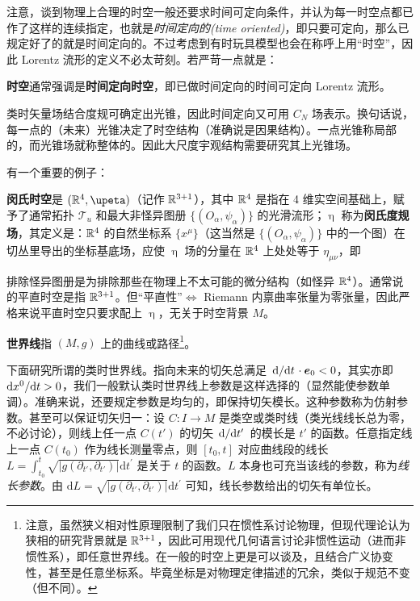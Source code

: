 注意，谈到物理上合理的时空一般还要求时间可定向条件，并认为每一时空点都已作了这样的连续指定，也就是\textit{时间定向的(time oriented)}，即只要可定向，那么已规定好了的就是时间定向的。不过考虑到有时玩具模型也会在称呼上用“时空”，因此 Lorentz 流形的定义不必太苛刻。若严苛一点就是：
    \begin{definition}
        \textbf{时空}通常强调是\textbf{时间定向时空}，即已做时间定向的时间可定向 Lorentz 流形。
    \end{definition}
    类时矢量场结合度规可确定出光锥，因此时间定向又可用 $C_N$ 场表示。换句话说，每一点的（未来）光锥决定了时空结构（准确说是因果结构）。一点光锥称局部的，而光锥场就称整体的。因此大尺度宇观结构需要研究其上光锥场。

    有一个重要的例子：
    \begin{eg}
        \textbf{闵氏时空}是 $(\R^4,\upeta)$（记作 $\mathbb{R}^{3+1}$），其中 $\mathbb{R}^4$ 是指在 4 维实空间基础上，赋予了通常拓扑 $\mathcal T_u$ 和最大非怪异图册 $\{(O_\alpha,\psi_\alpha)\}$ 的光滑流形；$\upeta$ 称为\textbf{闵氏度规场}，其定义是：$\mathbb{R}^4$ 的自然坐标系 $\{x^\mu\}$（这当然是 $\{(O_\alpha,\psi_\alpha)\}$ 中的一个图）在切丛里导出的坐标基底场，应使 $\upeta$ 场的分量在 $\mathbb{R}^4$ 上处处等于 $\eta_{\mu\nu}$，即
    \end{eg}



    排除怪异图册是为排除那些在物理上不太可能的微分结构（如怪异 $\mathbb{R}^4$）。通常说的平直时空是指 $\mathbb{R}^{3+1}$。但“平直性”$\iff$ Riemann 内禀曲率张量为零张量，因此严格来说平直时空只要求配上 $\upeta$，无关于时空背景 $M$。

\begin{definition}
    \textbf{世界线}指 $(M,g)$ 上的曲线或路径\footnote{注意，虽然狭义相对性原理限制了我们只在惯性系讨论物理，但现代理论认为狭相的研究背景就是 $\mathbb{R}^{3+1}$，因此可用现代几何语言讨论非惯性运动（进而非惯性系），即任意世界线。在一般的时空上更是可以谈及，且结合广义协变性，甚至是任意坐标系。毕竟坐标是对物理定律描述的冗余，类似于规范不变（但不同）。}。
\end{definition}

下面研究所谓的类时世界线。指向未来的切矢总满足 $\dv*{t}\cdot\vb* e_0<0$，其实亦即 $\text dx^0/\text d t>0$，我们一般默认类时世界线上参数是这样选择的（显然能使参数单调）。准确来说，还要规定参数是均匀的，即保持切矢模长。这种参数称为仿射参数。甚至可以保证切矢归一：设 $C: I \rightarrow M$ 是类空或类时线（类光线线长总为零，不必讨论），则线上任一点 $C(t')$ 的切矢 $\dv*{t'}$ 的模长是 $t'$ 的函数。任意指定线上一点 $C\left(t_0\right)$ 作为线长测量零点，则 $[t_0,t]$ 对应曲线段的线长 $L=\int_{t_0}^t\sqrt{|g(\partial_{t'},\partial_{t'})|}\mathrm{d} t^{\prime}$ 是关于 $t$ 的函数。$L$ 本身也可充当该线的参数，称为\textit{线长参数}。由 $\mathrm{d} L=\sqrt{|g(\partial_{t'},\partial_{t'})|}\mathrm{d} t^{\prime}$ 可知，线长参数给出的切矢有单位长。

